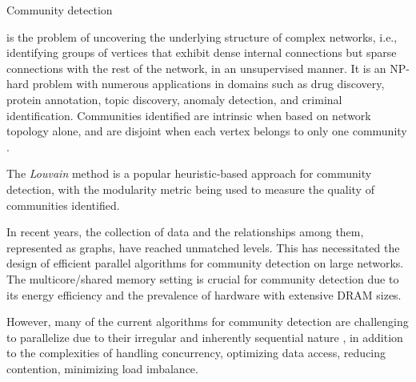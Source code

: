 Community detection is the problem of uncovering the underlying structure of complex networks, i.e., identifying groups of vertices that exhibit dense internal connections but sparse connections with the rest of the network, in an unsupervised manner. It is an NP-hard problem with numerous applications in domains such as drug discovery, protein annotation, topic discovery, anomaly detection, and criminal identification. Communities identified are intrinsic when based on network topology alone, and are disjoint when each vertex belongs to only one community \cite{com-gregory10}. The \textit{Louvain} method \cite{com-blondel08} is a popular heuristic-based approach for community detection, with the modularity metric \cite{com-newman06} being used to measure the quality of communities identified.

In recent years, the collection of data and the relationships among them, represented as graphs, have reached unmatched levels. This has necessitated the design of efficient parallel algorithms for community detection on large networks. The multicore/shared memory setting is crucial for community detection due to its energy efficiency and the prevalence of hardware with extensive DRAM sizes. However, many of the current algorithms for community detection are challenging to parallelize due to their irregular and inherently sequential nature \cite{com-halappanavar17}, in addition to the complexities of handling concurrency, optimizing data access, reducing contention, minimizing load imbalance.

